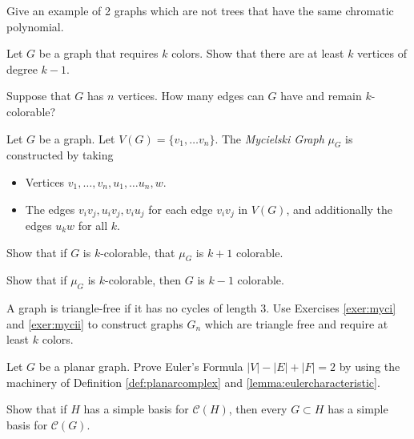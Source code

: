 \begin{exercise}
Give an example of 2 graphs which are not trees that have the same chromatic polynomial. 
\label{exer:chromaticpolynomial}
\end{exercise}

\begin{exercise}
Let $G$ be a graph that requires $k$ colors. Show that there are at least $k$ vertices of degree $k-1$. 
\label{exer:coloringedges}
\end{exercise}

\begin{exercise}
Suppose that $G$ has $n$ vertices. How many edges can $G$ have and remain $k$-colorable?
\label{exer:maximaledges}
\end{exercise}


Let $G$ be a graph. Let $V(G)=\{v_1, \ldots v_n\}.$ The \emph{Mycielski Graph} $\mu_G$ is constructed by taking 
\begin{itemize}
\item Vertices $v_1, \ldots, v_n, u_1, \ldots u_n, w$. 
\item The edges $v_iv_j, u_iv_j, v_iu_j$ for each edge $v_iv_j$ in $V(G)$, and additionally the edges $u_kw$ for all $k$. 
\end{itemize}

\begin{exercise}[Mycielski I]
Show that if $G$ is $k$-colorable, that $\mu_G$ is $k+1$ colorable. \label{exer:myci}
\end{exercise}

\begin{exercise}[Mycielski II]
Show that if $\mu_G$ is $k$-colorable, then $G$ is $k-1$ colorable.  \label{exer:mycii}
\end{exercise}

\begin{exercise}
A graph is triangle-free if it has no cycles of length 3. Use Exercises \ref{exer:myci} and \ref{exer:mycii} to construct graphs $G_n$ which are triangle free and require at least $k$ colors.  \label{exer:myciii}
\end{exercise}

\begin{exercise}
Let $G$ be a planar graph. Prove Euler's Formula $|V|-|E|+|F|=2$ by using the machinery of Definition \ref{def:planarcomplex} and \ref{lemma:eulercharacteristic}.
\label{exer:eulercharacteristic}
\end{exercise}


\begin{exercise}
Show that if $H$ has a simple basis for $\mathcal C(H)$, then every $G\subset H$ has a simple basis for $\mathcal C(G)$.  \label{exer:simplebasis} 
\end{exercise}
